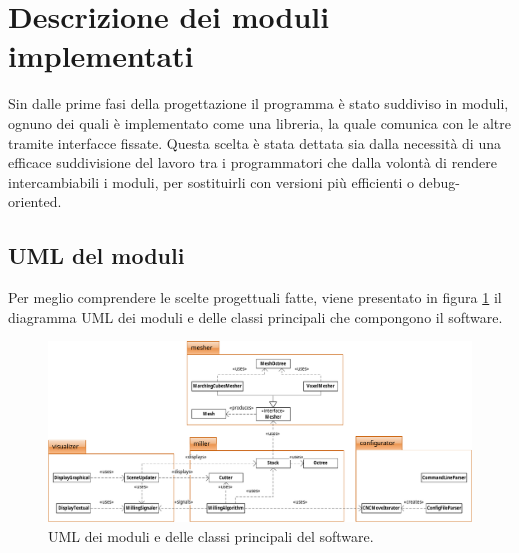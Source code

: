 \section{Descrizione dei moduli implementati}
Sin dalle prime fasi della progettazione il programma è stato suddiviso in moduli, ognuno dei quali è implementato come una libreria, la quale comunica con le altre tramite interfacce fissate. Questa scelta è stata dettata sia dalla necessità di una efficace suddivisione del lavoro tra i programmatori che dalla volontà di rendere intercambiabili i moduli, per sostituirli con versioni più efficienti o debug-oriented.


\subsection{UML del moduli}
Per meglio comprendere le scelte progettuali fatte, viene presentato in figura \ref{fig:uml_cncsimulator} il diagramma UML dei moduli e delle classi principali che compongono il software.

\begin{figure}
	\centering
	\includegraphics{img/uml_cncsimulator}
	\caption{UML dei moduli e delle classi principali del software.}
	\label{fig:uml_cncsimulator}
\end{figure}








